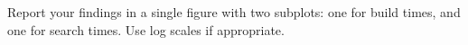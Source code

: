 Report your findings in a single figure with two subplots: one for build times, and one for search times.
Use log scales if appropriate.

\begin{comment} %
Your figure should resemble the following plots, though your results may be less smooth.
%
\begin{figure}[H] %
    \centering
    \begin{subfigure}[b]{.5\textwidth}
        \centering
        \texttt{[image: figures/BuildTimes.pdf]}
    \end{subfigure}%
    \begin{subfigure}[b]{.5\textwidth}
        \centering
        \texttt{[image: figures/SearchTimes.pdf]}
    \end{subfigure}
\end{figure}
\end{comment}
